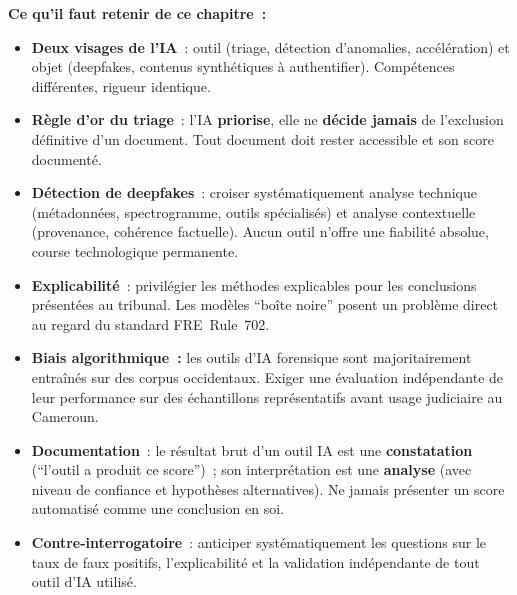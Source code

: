 \begin{boxresume}
\textbf{Ce qu'il faut retenir de ce chapitre~:}
\begin{itemize}
    \item \textbf{Deux visages de l'IA}~: outil (triage, détection
          d'anomalies, accélération) et objet (deepfakes, contenus
          synthétiques à authentifier). Compétences différentes,
          rigueur identique.

    \item \textbf{Règle d'or du triage}~: l'IA \textbf{priorise},
          elle ne \textbf{décide jamais} de l'exclusion définitive
          d'un document. Tout document doit rester accessible
          et son score documenté.

    \item \textbf{Détection de deepfakes}~: croiser systématiquement
          analyse technique (métadonnées, spectrogramme, outils
          spécialisés) et analyse contextuelle (provenance,
          cohérence factuelle). Aucun outil n'offre une fiabilité
          absolue, course technologique permanente.

    \item \textbf{Explicabilité}~: privilégier les méthodes
          explicables pour les conclusions présentées au tribunal.
          Les modèles ``boîte noire'' posent un problème direct
          au regard du standard FRE~Rule~702.

    \item \textbf{Biais algorithmique~:} les outils d'IA forensique
          sont majoritairement entraînés sur des corpus occidentaux.
          Exiger une évaluation indépendante de leur performance
          sur des échantillons représentatifs avant usage judiciaire
          au Cameroun.

    \item \textbf{Documentation}~: le résultat brut d'un outil IA
          est une \textbf{constatation} (``l'outil a produit ce
          score'')~; son interprétation est une \textbf{analyse}
          (avec niveau de confiance et hypothèses alternatives).
          Ne jamais présenter un score automatisé comme une
          conclusion en soi.

    \item \textbf{Contre-interrogatoire}~: anticiper systématiquement
          les questions sur le taux de faux positifs, l'explicabilité
          et la validation indépendante de tout outil d'IA utilisé.
\end{itemize}
\end{boxresume}

